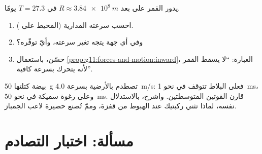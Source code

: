 \begin{exercise}[$\star\star\star$]\label{exo:g11:forces-and-motion:14}
يدور القمر على بعد $R \approx \qty{3.84e8}{m}$ في $T = \num{27.3}$ يومًا.
\begin{enumerate}
  \item احسب سرعته المدارية (المحيط على ).
  \item وفي أي جهة يتجه تغير سرعته، وأيّ 
        توفّره؟
  \item حسّن، باستعمال \cref{prop:g11:forces-and-motion:inward}، العبارة:
        ``لا يسقط القمر لأنه يتحرك بسرعة كافية''.
\end{enumerate}
\end{exercise}

\begin{exercise}[$\star\star\star$]\label{exo:g11:forces-and-motion:15}
بيضة كتلتها \qty{50}{g} تصطدم بالأرضية بسرعة \qty{4.0}{m/s}: فعلى البلاط
تتوقف في نحو \qty{1}{ms}، وعلى رغوة سميكة في نحو \qty{50}{ms}. قارن
القوتين المتوسطتين. واشرح، بالاستدلال نفسه، لماذا تثني
ركبتيك عند الهبوط من قفزة، وممّ تُصنع حصيرة لاعب الجمباز.
\end{exercise}

\section{مسألة: اختبار التصادم}


